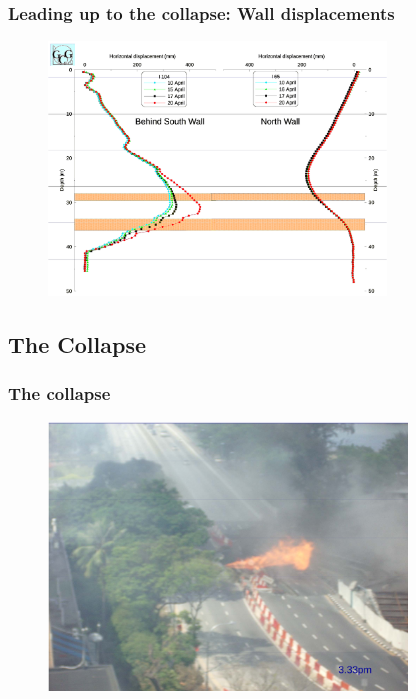 \documentclass[handout]{beamer}
\begin{document}
\begin{frame}
\frametitle{Leading up to the collapse: Wall displacements}
\begin{figure}[ht]
	\centering
	\includegraphics[width=0.8\textwidth]{figs/disp4.png}
\end{figure}
\end{frame}

\subsection{The Collapse}
\begin{frame}
\frametitle{The collapse}
\begin{figure}[ht]
	\centering
	\includegraphics[width=0.85\textwidth]{figs/collapse1.png}
\end{figure}
\end{frame}
\end{document}
